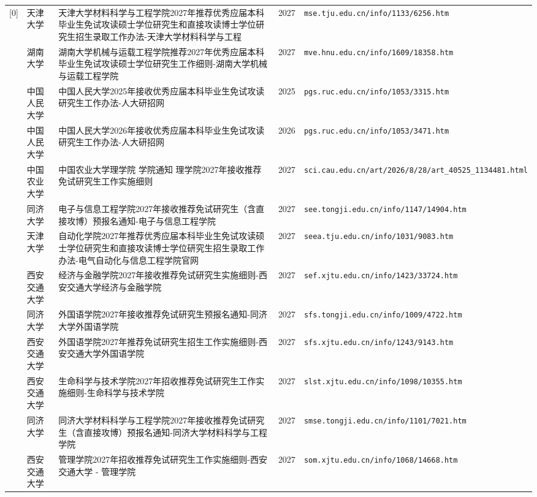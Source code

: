 {\begin{longtable}{@{}p{1.15cm}p{2.9cm}p{6.3cm}p{0.85cm}p{5.0cm}@{}}
[0] & 天津大学 & 天津大学材料科学与工程学院2027年推荐优秀应届本科毕业生免试攻读硕士学位研究生和直接攻读博士学位研究生招生录取工作办法-天津大学材料科学与工程 & 2027 & \texttt{mse.tju.edu.cn/info/1133/6256.htm} \\
[0] & 湖南大学 & 湖南大学机械与运载工程学院推荐2027年优秀应届本科毕业生免试攻读硕士学位研究生工作细则-湖南大学机械与运载工程学院 & 2027 & \texttt{mve.hnu.edu.cn/info/1609/18358.htm} \\
[0] & 中国人民大学 & 中国人民大学2025年接收优秀应届本科毕业生免试攻读研究生工作办法-人大研招网 & 2025 & \texttt{pgs.ruc.edu.cn/info/1053/3315.htm} \\
[0] & 中国人民大学 & 中国人民大学2026年接收优秀应届本科毕业生免试攻读研究生工作办法-人大研招网 & 2026 & \texttt{pgs.ruc.edu.cn/info/1053/3471.htm} \\
[0] & 中国农业大学 & 中国农业大学理学院 学院通知 理学院2027年接收推荐免试研究生工作实施细则 & 2027 & \texttt{sci.cau.edu.cn/art/2026/8/28/art\_40525\_1134481.html} \\
[0] & 同济大学 & 电子与信息工程学院2027年接收推荐免试研究生（含直接攻博）预报名通知-电子与信息工程学院 & 2027 & \texttt{see.tongji.edu.cn/info/1147/14904.htm} \\
[0] & 天津大学 & 自动化学院2027年推荐优秀应届本科毕业生免试攻读硕士学位研究生和直接攻读博士学位研究生招生录取工作办法-电气自动化与信息工程学院官网 & 2027 & \texttt{seea.tju.edu.cn/info/1031/9083.htm} \\
[0] & 西安交通大学 & 经济与金融学院2027年接收推荐免试研究生实施细则-西安交通大学经济与金融学院 & 2027 & \texttt{sef.xjtu.edu.cn/info/1423/33724.htm} \\
[0] & 同济大学 & 外国语学院2027年接收推荐免试研究生预报名通知-同济大学外国语学院 & 2027 & \texttt{sfs.tongji.edu.cn/info/1009/4722.htm} \\
[0] & 西安交通大学 & 外国语学院2027年推荐免试研究生招生工作实施细则-西安交通大学外国语学院 & 2027 & \texttt{sfs.xjtu.edu.cn/info/1243/9143.htm} \\
[0] & 西安交通大学 & 生命科学与技术学院2027年招收推荐免试研究生工作实施细则-生命科学与技术学院 & 2027 & \texttt{slst.xjtu.edu.cn/info/1098/10355.htm} \\
[0] & 同济大学 & 同济大学材料科学与工程学院2027年接收推荐免试研究生（含直接攻博）预报名通知-同济大学材料科学与工程学院 & 2027 & \texttt{smse.tongji.edu.cn/info/1101/7021.htm} \\
[0] & 西安交通大学 & 管理学院2027年招收推荐免试研究生工作实施细则-西安交通大学 - 管理学院 & 2027 & \texttt{som.xjtu.edu.cn/info/1068/14668.htm} \\

\end{longtable}}
